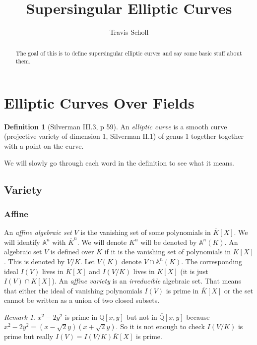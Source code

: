 \documentclass[11pt]{article}
\newcommand{\mytitle}{Supersingular Elliptic Curves}
\newcommand{\myauthor}{Travis Scholl}
\newcommand{\BB}[1]{\mathbb{#1}} %
\newcommand{\QQ}{\BB{Q}}
\renewcommand{\AA}{\BB{A}} %
\theoremstyle{plain}%
\theoremstyle{definition}
\newtheorem{defn}[thm]{Definition}
\theoremstyle{remark}
\newtheorem{rem}[thm]{Remark}
\begin{document}
\title{\bfseries\sffamily \mytitle}
\author{\sc \myauthor }
\maketitle

\begin{abstract}
	The goal of this is to define supersingular elliptic curves and say some basic stuff about them.
\end{abstract}

\section{Elliptic Curves Over Fields}

\begin{defn}[Silverman III.3, p 59]
	An \emph{elliptic curve} is a smooth curve (projective variety of dimension 1, Silverman II.1) of genus 1 together together with a point on the curve.
\end{defn}

We will slowly go through each word in the definition to see what it means.

\subsection{Variety}

\subsubsection{Affine}

An \emph{affine algebraic set} $V$ is the vanishing set of some polynomials in $\overline{K}[X]$. We will identify $\AA^n$ with $\overline{K}^n$. We will denote $K^n$ will be denoted by $\AA^n(K)$. An algebraic set $V$ is defined over $K$ if it is the vanishing set of polynomials in $K[X]$. This is denoted by $V/K$. Let $V(K)$ denote $V \cap\AA^n(K)$. The corresponding ideal $I(V)$ lives in $\overline{K}[X]$ and $I(V/K)$ lives in $K[X]$ (it is just $I(V)\cap K[X]$). An \emph{affine variety} is an \emph{irreducible} algebraic set. That means that either the ideal of vanishing polynomials $I(V)$ is prime in $\overline{K}[X]$ or the set cannot be written as a union of two closed subsets.

\begin{rem}
	$x^2-2y^2$ is prime in $\QQ[x,y]$ but not in $\overline{\QQ}[x,y]$ because $x^2-2y^2 = (x-\sqrt{2}y)(x+\sqrt{2}y)$. So it is not enough to check $I(V/K)$ is prime but really $I(V) = I(V/K)\overline{K}[X]$ is prime.
\end{rem}
\end{document}
